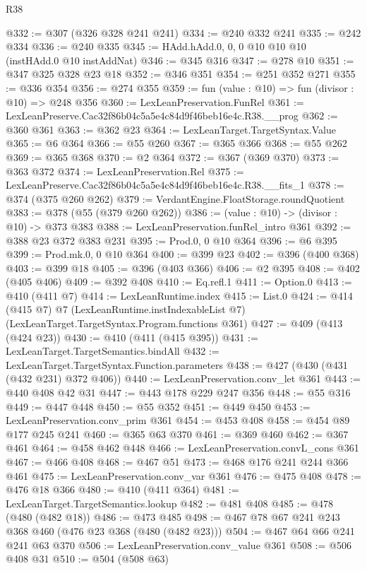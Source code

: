 \begin{lexlean}{R38}
\begin{coremodule}
@332 := @307 (@326 @328 @241 @241)
@334 := @240 @332 @241
@335 := @242 @334
@336 := @240 @335
@345 := HAdd.hAdd.{0, 0, 0} @10 @10 @10 (instHAdd.{0} @10 instAddNat)
@346 := @345 @316
@347 := @278 @10
@351 := @347 @325 @328 @23 @18
@352 := @346 @351
@354 := @251 @352 @271
@355 := @336 @354
@356 := @274 @355
@359 := fun (value : @10) => fun (divisor : @10) => @248 @356
@360 := LexLeanPreservation.FunRel
@361 := LexLeanPreserve.Cac32f86b04c5a5e4c84d9f46beb16e4c.R38.__prog
@362 := @360 @361
@363 := @362 @23
@364 := LexLeanTarget.TargetSyntax.Value
@365 := @6 @364
@366 := @55 @260
@367 := @365 @366
@368 := @55 @262
@369 := @365 @368
@370 := @2 @364
@372 := @367 (@369 @370)
@373 := @363 @372
@374 := LexLeanPreservation.Rel
@375 := LexLeanPreserve.Cac32f86b04c5a5e4c84d9f46beb16e4c.R38.__fits_1
@378 := @374 (@375 @260 @262)
@379 := VerdantEngine.FloatStorage.roundQuotient
@383 := @378 (@55 (@379 @260 @262))
@386 := (value : @10) -> (divisor : @10) -> @373 @383
@388 := LexLeanPreservation.funRel_intro @361
@392 := @388 @23 @372 @383 @231
@395 := Prod.{0, 0} @10 @364
@396 := @6 @395
@399 := Prod.mk.{0, 0} @10 @364
@400 := @399 @23
@402 := @396 (@400 @368)
@403 := @399 @18
@405 := @396 (@403 @366)
@406 := @2 @395
@408 := @402 (@405 @406)
@409 := @392 @408
@410 := Eq.refl.{1}
@411 := Option.{0}
@413 := @410 (@411 @7)
@414 := LexLeanRuntime.index
@415 := List.{0}
@424 := @414
    (@415 @7)
    @7
    (LexLeanRuntime.instIndexableList @7)
    (LexLeanTarget.TargetSyntax.Program.functions @361)
@427 := @409 (@413 (@424 @23))
@430 := @410 (@411 (@415 @395))
@431 := LexLeanTarget.TargetSemantics.bindAll
@432 := LexLeanTarget.TargetSyntax.Function.parameters
@438 := @427 (@430 (@431 (@432 @231) @372 @406))
@440 := LexLeanPreservation.conv_let @361
@443 := @440 @408 @42 @31
@447 := @443 @178 @229 @247 @356
@448 := @55 @316
@449 := @447 @448
@450 := @55 @352
@451 := @449 @450
@453 := LexLeanPreservation.conv_prim @361
@454 := @453 @408
@458 := @454 @89 @177 @245 @241
@460 := @365 @63 @370
@461 := @369 @460
@462 := @367 @461
@464 := @458 @462 @448
@466 := LexLeanPreservation.convL_cons @361
@467 := @466 @408
@468 := @467 @51
@473 := @468 @176 @241 @244 @366 @461
@475 := LexLeanPreservation.conv_var @361
@476 := @475 @408
@478 := @476 @18 @366
@480 := @410 (@411 @364)
@481 := LexLeanTarget.TargetSemantics.lookup
@482 := @481 @408
@485 := @478 (@480 (@482 @18))
@486 := @473 @485
@498 := @467 @78 @67 @241 @243 @368 @460 (@476 @23 @368 (@480 (@482 @23)))
@504 := @467 @64 @66 @241 @241 @63 @370
@506 := LexLeanPreservation.conv_value @361
@508 := @506 @408 @31
@510 := @504 (@508 @63)

\end{coremodule}
\end{lexlean}
